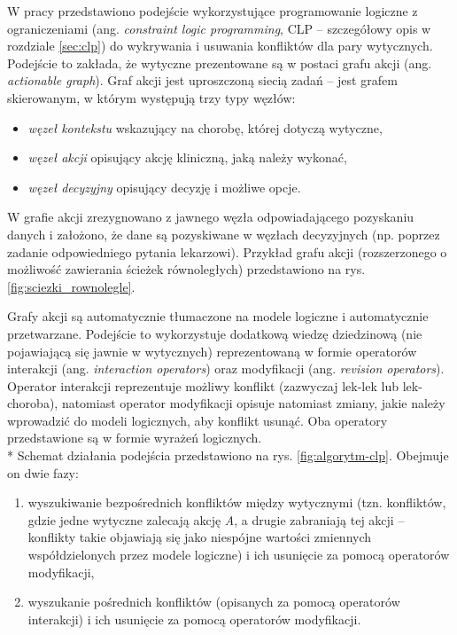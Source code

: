 W pracy \cite{SzWilk2} przedstawiono podejście wykorzystujące programowanie logiczne z ograniczeniami (ang. \textit{constraint logic programming}, CLP -- szczegółowy opis w rozdziale \ref{sec:clp}) do wykrywania i usuwania konfliktów dla pary wytycznych. Podejście to zakłada, że wytyczne prezentowane są w postaci grafu akcji (ang. \textit{actionable graph}). Graf akcji jest uproszczoną siecią zadań -- jest grafem skierowanym, w którym występują trzy typy węzłów:
\begin{itemize}
\item \textit{węzeł kontekstu} wskazujący na chorobę, której dotyczą wytyczne,
\item \textit{węzeł akcji} opisujący akcję kliniczną, jaką należy wykonać,
\item \textit{węzeł decyzyjny} opisujący decyzję i możliwe opcje.
\end{itemize}

W grafie akcji zrezygnowano z jawnego węzła odpowiadającego pozyskaniu danych i założono, że dane są pozyskiwane w węzłach decyzyjnych (np. poprzez zadanie odpowiedniego pytania lekarzowi). Przykład grafu akcji (rozszerzonego o możliwość zawierania ścieżek równoległych) przedstawiono na rys. \ref{fig:sciezki_rownolegle}.

Grafy akcji są automatycznie tłumaczone na modele logiczne i automatycznie przetwarzane. Podejście to wykorzystuje dodatkową wiedzę dziedzinową (nie pojawiającą się jawnie w wytycznych) reprezentowaną w formie operatorów interakcji (ang. \textit{interaction operators}) oraz modyfikacji (ang. \textit{revision operators}). Operator interakcji reprezentuje możliwy konflikt (zazwyczaj lek-lek lub lek-choroba), natomiast operator modyfikacji opisuje natomiast zmiany, jakie należy wprowadzić do modeli logicznych, aby konflikt usunąć. Oba operatory przedstawione są w formie wyrażeń logicznych.
\\*
Schemat działania podejścia przedstawiono na rys. \ref{fig:algorytm-clp}. Obejmuje on dwie fazy:
\begin{enumerate}
\item wyszukiwanie bezpośrednich konfliktów między wytycznymi (tzn. konfliktów, gdzie jedne wytyczne zalecają akcję \textit{A}, a drugie zabraniają tej akcji -- konflikty takie objawiają się jako niespójne wartości zmiennych współdzielonych przez modele logiczne) i ich usunięcie za pomocą operatorów modyfikacji,
\item wyszukanie pośrednich konfliktów (opisanych za pomocą operatorów interakcji) i ich usunięcie za pomocą operatorów modyfikacji.
\end{enumerate}

